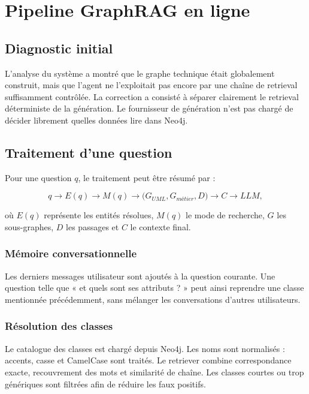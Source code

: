 \chapter{Pipeline GraphRAG en ligne}

\section{Diagnostic initial}

L'analyse du système a montré que le graphe technique était globalement construit, mais que l'agent ne l'exploitait pas encore par une chaîne de retrieval suffisamment contrôlée. La correction a consisté à séparer clairement le retrieval déterministe de la génération. Le fournisseur de génération n'est pas chargé de décider librement quelles données lire dans Neo4j.

\section{Traitement d'une question}

Pour une question $q$, le traitement peut être résumé par :

\begin{equation}
q\rightarrow E(q)\rightarrow M(q)\rightarrow
\bigl(G_{UML},G_{métier},D\bigr)\rightarrow C\rightarrow LLM,
\end{equation}

où $E(q)$ représente les entités résolues, $M(q)$ le mode de recherche, $G$ les sous-graphes, $D$ les passages et $C$ le contexte final.

\subsection{Mémoire conversationnelle}

Les derniers messages utilisateur sont ajoutés à la question courante. Une question telle que « et quels sont ses attributs ? » peut ainsi reprendre une classe mentionnée précédemment, sans mélanger les conversations d'autres utilisateurs.

\subsection{Résolution des classes}

Le catalogue des classes est chargé depuis Neo4j. Les noms sont normalisés : accents, casse et CamelCase sont traités. Le retriever combine correspondance exacte, recouvrement des mots et similarité de chaîne. Les classes courtes ou trop génériques sont filtrées afin de réduire les faux positifs.

